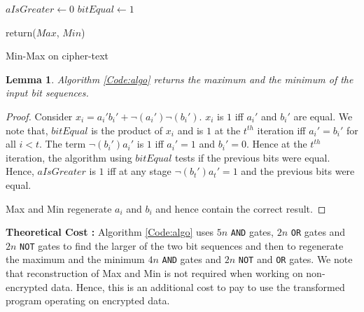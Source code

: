 \documentclass{acm_proc_article-sp}
\begin{document}
\begin{algorithm}[H]

\SetVline



 $aIsGreater \leftarrow 0$\;
 $bitEqual \leftarrow 1$\;
	


return($Max$, $Min$)

 \caption{Min-Max on cipher-text \label{Code:algo}}


\end{algorithm}

\newtheorem{theorem}{Lemma}
\begin{theorem}
Algorithm \autoref{Code:algo} returns the maximum and the minimum of the input bit sequences. 
\end{theorem}

\begin{proof}

  Consider $x_i = a_i'b_i'+\neg(a_i')\neg(b_i') $. $x_i$ is $1$ iff $a_i'$ and $b_i'$ are equal. We note that, $bitEqual$ is the product of $x_i$ and is $1$ at the $t^{th}$ iteration iff $a_i'=b_i'$ for all $i < t$. The term $\neg(b_i')a_i'$ is $1$ iff $a_i'=1$ and $b_i'=0$. Hence at the $t^{th}$ iteration, the algorithm using $bitEqual$ tests if the previous bits were equal. Hence, $aIsGreater$ is $1$ iff at any stage  $\neg(b_t')a_t'=1$ and the previous bits were equal.

Max and Min regenerate $a_i$ and $b_i$ and hence contain the correct result.  
\end{proof}
\textbf{Theoretical Cost :} Algorithm \autoref{Code:algo} uses $5n$ \texttt{AND} gates, $2n$ \texttt{OR} gates and $2n$ \texttt{NOT} gates to find the larger of the two bit sequences and then to regenerate the maximum and the minimum $4n$ \texttt{AND} gates and $2n$ \texttt{NOT} and \texttt{OR} gates. We note that reconstruction of Max and  Min is not required when working on non-encrypted data. Hence, this is an additional cost to pay to use the transformed program operating on encrypted data. 
\end{document}
